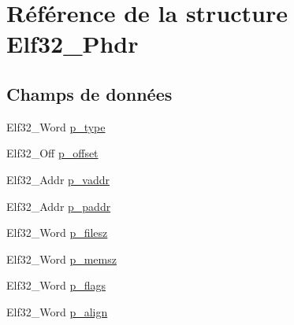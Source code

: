 \hypertarget{structElf32__Phdr}{\section{Référence de la structure Elf32\+\_\+\+Phdr}
\label{structElf32__Phdr}
}
\subsection*{Champs de données}
\begin{DoxyCompactItemize}
\item 
Elf32\+\_\+\+Word \hyperlink{structElf32__Phdr_a8b1d2942ddb9abcb85db1429b5116923}{p\+\_\+type}
\item 
Elf32\+\_\+\+Off \hyperlink{structElf32__Phdr_ac590d4c4b26104216e53058b5b03eef0}{p\+\_\+offset}
\item 
Elf32\+\_\+\+Addr \hyperlink{structElf32__Phdr_a01a298ebc899bcf9c23211a7bf1155a6}{p\+\_\+vaddr}
\item 
Elf32\+\_\+\+Addr \hyperlink{structElf32__Phdr_af18f0a179a5fca09e3c04bcdce3fac2f}{p\+\_\+paddr}
\item 
Elf32\+\_\+\+Word \hyperlink{structElf32__Phdr_ac9151f2e11001284bf1c7d2d2659555c}{p\+\_\+filesz}
\item 
Elf32\+\_\+\+Word \hyperlink{structElf32__Phdr_ada1cdd3d6ccb79a17bed0e3c21379c84}{p\+\_\+memsz}
\item 
Elf32\+\_\+\+Word \hyperlink{structElf32__Phdr_a35c457e6828894b7b275730593802050}{p\+\_\+flags}
\item 
Elf32\+\_\+\+Word \hyperlink{structElf32__Phdr_afd09d9e4297b13fc94fd57d09f2a9f70}{p\+\_\+align}
\end{DoxyCompactItemize}



